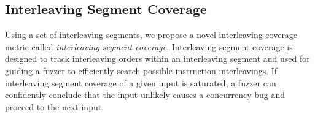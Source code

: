 % 



\subsection{Interleaving Segment Coverage}
\label{ss:coverage}

\newcommand{\intcov}{interleaving segment coverage\xspace}
\newcommand{\Intcov}{Interleaving segment coverage\xspace}


Using a set of interleaving segments, we propose a novel interleaving coverage metric called \textit{\intcov}.
\Intcov is designed to track interleaving orders
within an interleaving segment and used for guiding a fuzzer to  
efficiently search possible instruction interleavings.
If \intcov of a given input is saturated, 
a fuzzer can confidently conclude that the input unlikely causes a concurrency bug and proceed to the next input.


